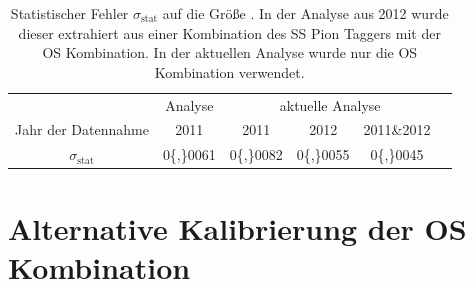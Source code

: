 \begin{table}[htbp]
	\centering
	\caption{Statistischer Fehler $\sigma_\text{stat}$ auf die Größe \dmd. In der Analyse aus \num{2012} \cite{dmd_messung} wurde dieser extrahiert aus einer Kombination des SS Pion Taggers mit der OS Kombination. In der aktuellen Analyse wurde nur die OS Kombination verwendet.}
	\label{tab:statFehler} 
	\begin{tabular}{c|c|cccc}
	\toprule
         			&\lhcb Analyse & \multicolumn{3}{c}{aktuelle Analyse} \\  
        Jahr der Datennahme & \num{2011}	 & \num{2011} & \num{2012} & \num{2011}\&\num{2012}\\ 
        \midrule
       $\sigma_\text{stat}$	& \num{0{,}0061} & \num{0{,}0082} & \num{0{,}0055} & \num{0{,}0045} \\ 
       \bottomrule
	\end{tabular}
\end{table}

\section{Alternative Kalibrierung der OS Kombination}


